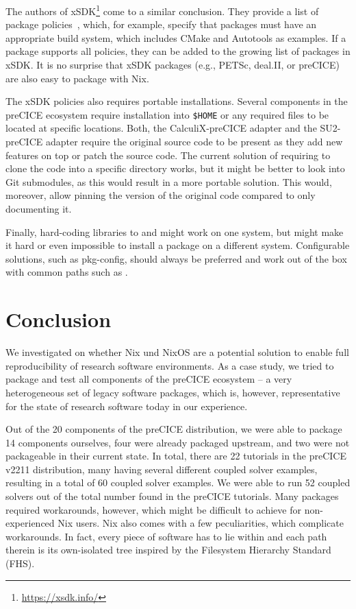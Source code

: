 \documentclass{eceasst}
\begin{document}
The authors of xSDK\footnote{\url{https://xsdk.info/}} come to a similar conclusion.
They provide a list of package policies~\cite{xSDK2023}, which, for example, specify that packages must have an appropriate build system, which includes CMake and Autotools as examples.
If a package supports all policies, they can be added to the growing list of packages in xSDK.
It is no surprise that xSDK packages (e.g., PETSc, deal.II, or preCICE) are also easy to package with Nix.

The xSDK policies also requires portable installations. Several components in the preCICE ecosystem require installation into \texttt{\$HOME} or any required files to be located at specific locations.
Both, the CalculiX-preCICE adapter and the SU2-preCICE adapter require the original source code to be present as they add new features on top or patch the source code.
The current solution of requiring to clone the code into a specific directory works, but it might be better to look into Git submodules, as this would result in a more portable solution.
This would, moreover, allow pinning the version of the original code compared to only documenting it.

Finally, hard-coding libraries to  and  might work on one system, but might make it hard or even impossible to install a package on a different system.
Configurable solutions, such as pkg-config, should always be preferred and work out of the box with common paths such as .

\section{Conclusion}
\label{sec:conclusion}

We investigated on whether Nix und NixOS are a potential solution to enable full reproducibility of research software environments. As a case study, we tried to package and test all components of the preCICE ecosystem -- a very heterogeneous set of legacy software packages, which is, however, representative for the state of research software today in our experience.

Out of the 20 components of the preCICE distribution, we were able to package 14 components ourselves, four were already packaged upstream, and two were not packageable in their current state.
In total, there are 22 tutorials in the preCICE v2211 distribution, many having several different coupled solver examples, resulting in a total of 60 coupled solver examples.
We were able to run 52 coupled solvers out of the total number found in the preCICE tutorials.
Many packages required workarounds, however, which might be difficult to achieve for non-experienced Nix users.
Nix also comes with a few peculiarities, which complicate workarounds.
In fact, every piece of software has to lie within  and each path therein is its own-isolated tree inspired by the Filesystem Hierarchy Standard (FHS).
\end{document}
